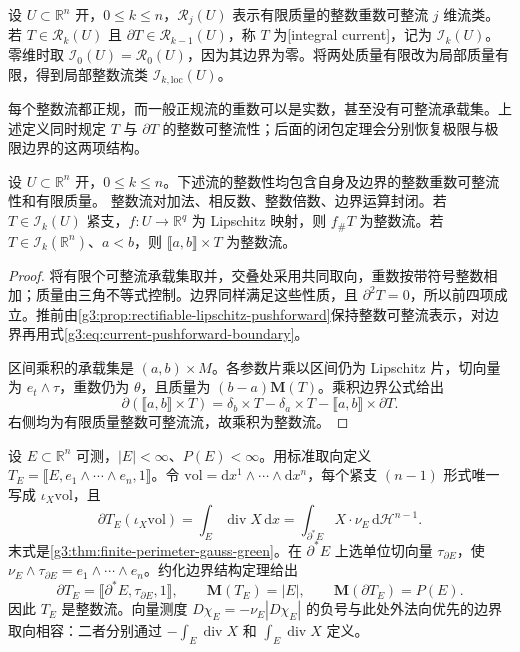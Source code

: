 \begin{definition}\label{g3:def:integer-current}
	设 \(U\subset\mathbb R^n\) 开，\(0\le k\le n\)，\(\mathcal R_j(U)\) 表示有限质量的整数重数可整流 \(j\) 维流类。若 \(T\in\mathcal R_k(U)\) 且 \(\partial T\in\mathcal R_{k-1}(U)\)，称 \(T\) 为[integral current]，记为 \(\mathcal I_k(U)\)。零维时取 \(\mathcal I_0(U)=\mathcal R_0(U)\)，因为其边界为零。将两处质量有限改为局部质量有限，得到局部整数流类 \(\mathcal I_{k,\mathrm{loc}}(U)\)。
\end{definition}

每个整数流都正规，而一般正规流的重数可以是实数，甚至没有可整流承载集。上述定义同时规定 \(T\) 与 \(\partial T\) 的整数可整流性；后面的闭包定理会分别恢复极限与极限边界的这两项结构。

\begin{proposition}\label{g3:prop:integer-current-operations}
	设 \(U\subset\mathbb R^n\) 开，\(0\le k\le n\)。下述流的整数性均包含自身及边界的整数重数可整流性和有限质量。
	整数流对加法、相反数、整数倍数、边界运算封闭。若 \(T\in\mathcal I_k(U)\) 紧支，\(f:U\to\mathbb R^q\) 为 Lipschitz 映射，则 \(f_\#T\) 为整数流。若 \(T\in\mathcal I_k(\mathbb R^n)\)、\(a<b\)，则 \(\lBrack a,b\rBrack\times T\) 为整数流。
\end{proposition}
\begin{proof}
	将有限个可整流承载集取并，交叠处采用共同取向，重数按带符号整数相加；质量由三角不等式控制。边界同样满足这些性质，且 \(\partial^2T=0\)，所以前四项成立。推前由\cref{g3:prop:rectifiable-lipschitz-pushforward}保持整数可整流表示，对边界再用式\eqref{g3:eq:current-pushforward-boundary}。

	区间乘积的承载集是 \((a,b)\times M\)。各参数片乘以区间仍为 Lipschitz 片，切向量为 \(e_t\wedge\tau\)，重数仍为 \(\theta\)，且质量为 \((b-a)\mathbf M(T)\)。乘积边界公式给出
	\[
		\partial(\lBrack a,b\rBrack\times T)
		=\delta_b\times T-\delta_a\times T-\lBrack a,b\rBrack\times\partial T.
	\]
	右侧均为有限质量整数可整流流，故乘积为整数流。
\end{proof}

\begin{example}\label{g3:exm:finite-perimeter-integral-current}
	设 \(E\subset\mathbb R^n\) 可测，\(|E|<\infty\)、\(P(E)<\infty\)。用标准取向定义 \(T_E=\lBrack E,e_1\wedge\cdots\wedge e_n,1\rBrack\)。令 \(\mathrm{vol}=\mathrm dx^1\wedge\cdots\wedge\mathrm dx^n\)，每个紧支 \((n-1)\) 形式唯一写成 \(\iota_X\mathrm{vol}\)，且
	\[
		\partial T_E(\iota_X\mathrm{vol})
		=\int_E\operatorname{div}X\,\mathrm dx
		=\int_{\partial^*E}X\cdot\nu_E\,\mathrm d\mathcal H^{n-1}.
	\]
	末式是\cref{g3:thm:finite-perimeter-gauss-green}。在 \(\partial^*E\) 上选单位切向量 \(\tau_{\partial E}\)，使
	\(\nu_E\wedge\tau_{\partial E}=e_1\wedge\cdots\wedge e_n\)。约化边界结构定理给出
	\[
		\partial T_E=\lBrack\partial^*E,\tau_{\partial E},1\rBrack,
		\qquad \mathbf M(T_E)=|E|,\qquad \mathbf M(\partial T_E)=P(E).
	\]
	因此 \(T_E\) 是整数流。向量测度 \(D\chi_E=-\nu_E|D\chi_E|\) 的负号与此处外法向优先的边界取向相容：二者分别通过 \(-\int_E\operatorname{div}X\) 和 \(\int_E\operatorname{div}X\) 定义。
\end{example}

